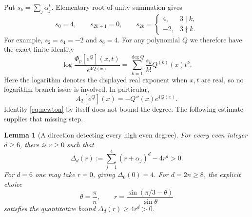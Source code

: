 \documentclass[11pt,a4paper]{article}
\newtheorem{lemma}[theorem]{Lemma}
\theoremstyle{remark}\newtheorem{remark}[theorem]{Remark}
\newcommand{\Ph}{\Phi_p}
\begin{document}
Put $s_k=\sum_j\alpha_j^k$. Elementary root-of-unity summation gives
\begin{equation}\label{eq:powers}
 s_0=4,\qquad s_{2k+1}=0,\qquad
 s_{2k}=\begin{cases}4,&3\mid k,\\-2,&3\nmid k.\end{cases}
\end{equation}
For example, $s_2=s_4=-2$ and $s_6=4$.
For any polynomial $Q$ we therefore have the exact finite identity
\begin{equation}\label{eq:newton}
 \log\frac{\Ph[e^Q](x,t)}{e^{4Q(x)}}
 =\sum_{k=1}^{\deg Q}\frac{s_k}{k!}Q^{(k)}(x)t^k.
\end{equation}
Here the logarithm denotes the displayed real exponent when $x,t$ are
real, so no logarithm-branch issue is involved. In particular,
\begin{equation}\label{eq:A2}
 A_2[e^Q](x)=-Q''(x)e^{4Q(x)}.
\end{equation}
Identity \eqref{eq:newton} by itself does not bound the degree. The
following estimate supplies that missing step.

\begin{lemma}[A direction detecting every high even degree]\label{lem:ray}
For every even integer $d\ge6$, there is $r\ge0$ such that
\begin{equation}\label{eq:gap}
 \Delta_d(r):=\sum_{j=1}^4(r+\alpha_j)^d-4r^d>0.
\end{equation}
For $d=6$ one may take $r=0$, giving $\Delta_6(0)=4$.
For $d=2n\ge8$, the explicit choice
\begin{equation}\label{eq:r}
 \theta=\frac\pi n,\qquad
 r=\frac{\sin(\pi/3-\theta)}{\sin\theta}
\end{equation}
satisfies the quantitative bound $\Delta_d(r)\ge4r^d>0$.
\end{lemma}
\end{document}
